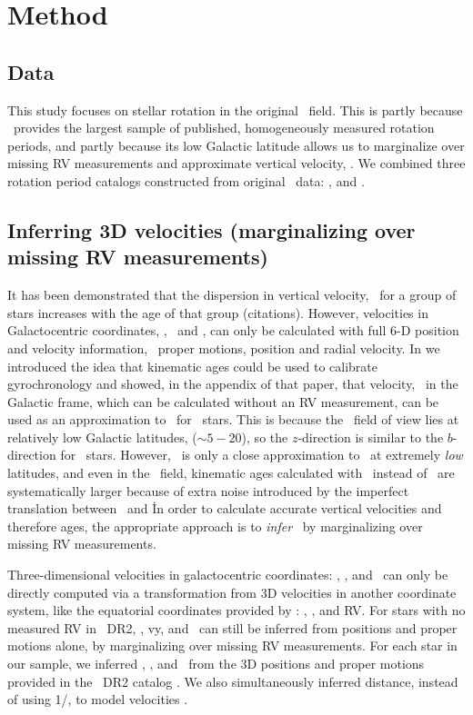 \section{Method}

\subsection{Data}
\label{sec:data}

This study focuses on stellar rotation in the original \kepler\ field.
This is partly because \kepler\ provides the largest sample of published,
homogeneously measured rotation periods, and partly because its low Galactic
latitude allows us to marginalize over missing RV measurements and approximate
vertical velocity, \vz.
We combined three rotation period catalogs constructed from original \kepler\
data: \citet{mcquillan2014}, \citet{santos2019} and \citet{garcia2014}.

\subsection{Inferring 3D velocities (marginalizing over missing RV
measurements)}

It has been demonstrated that the dispersion in vertical velocity, \vz\, for a
group of stars increases with the age of that group (citations).
However, velocities in Galactocentric coordinates, \vx, \vy\ and \vz, can only
be calculated with full 6-D position and velocity information, \ie\ proper
motions, position and radial velocity.
In \citet{angus2020} we introduced the idea that kinematic ages could be used
to calibrate gyrochronology and showed, in the appendix of that paper, that
velocity, \vb\ in the Galactic frame, which can be calculated without an RV
measurement, can be used as an approximation to \vz\ for \kepler\ stars.
This is because the \kepler\ field of view lies at relatively low Galactic
latitudes, ($\sim 5-20$\degrees), so the $z$-direction is similar to the
$b$-direction for \kepler\ stars.
However, \vb\ is only a close approximation to \vz\ at extremely {\it low}
latitudes, and even in the \kepler\ field, kinematic ages calculated with \vb\
instead of \vz\ are systematically larger because of extra noise introduced by
the imperfect translation between \vb\ and \vz\.
In order to calculate accurate vertical velocities and therefore ages, the
appropriate approach is to {\it infer} \vz\  by marginalizing over missing RV
measurements.

Three-dimensional velocities in galactocentric coordinates: \vx, \vy, and \vz\
can only be directly computed via a transformation from 3D velocities in
another coordinate system, like the equatorial coordinates provided by \gaia:
\mura, \mudec, and RV.
For stars with no measured RV in \gaia\ DR2, \vx, vy, and \vz\ can still be
inferred from positions and proper motions alone, by marginalizing over
missing RV measurements.
For each star in our sample, we inferred \vx, \vy, and \vz\ from the 3D
positions and proper motions provided in the \gaia\ DR2 catalog
\citep{brown2011}.
We also simultaneously inferred distance, instead of using 1/\parallax, to
model velocities \citep{bailer-jones2016}.

